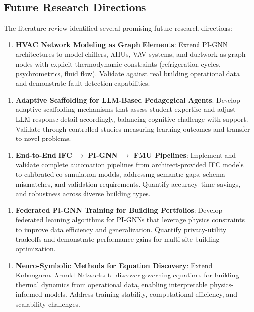 \documentclass[12pt,a4paper]{article}
\begin{document}
\subsection{Future Research Directions}

The literature review identified several promising future research directions:

\begin{enumerate}
  \item \textbf{HVAC Network Modeling as Graph Elements}: Extend PI-GNN architectures to model chillers, AHUs, VAV systems, and ductwork as graph nodes with explicit thermodynamic constraints (refrigeration cycles, psychrometrics, fluid flow). Validate against real building operational data and demonstrate fault detection capabilities.
\end{enumerate}

\begin{enumerate}
  \item \textbf{Adaptive Scaffolding for LLM-Based Pedagogical Agents}: Develop adaptive scaffolding mechanisms that assess student expertise and adjust LLM response detail accordingly, balancing cognitive challenge with support. Validate through controlled studies measuring learning outcomes and transfer to novel problems.
\end{enumerate}

\begin{enumerate}
  \item \textbf{End-to-End IFC $\rightarrow$ PI-GNN $\rightarrow$ FMU Pipelines}: Implement and validate complete automation pipelines from architect-provided IFC models to calibrated co-simulation models, addressing semantic gaps, schema mismatches, and validation requirements. Quantify accuracy, time savings, and robustness across diverse building types.
\end{enumerate}

\begin{enumerate}
  \item \textbf{Federated PI-GNN Training for Building Portfolios}: Develop federated learning algorithms for PI-GNNs that leverage physics constraints to improve data efficiency and generalization. Quantify privacy-utility tradeoffs and demonstrate performance gains for multi-site building optimization.
\end{enumerate}

\begin{enumerate}
  \item \textbf{Neuro-Symbolic Methods for Equation Discovery}: Extend Kolmogorov-Arnold Networks to discover governing equations for building thermal dynamics from operational data, enabling interpretable physics-informed models. Address training stability, computational efficiency, and scalability challenges.
\end{enumerate}
\end{document}
